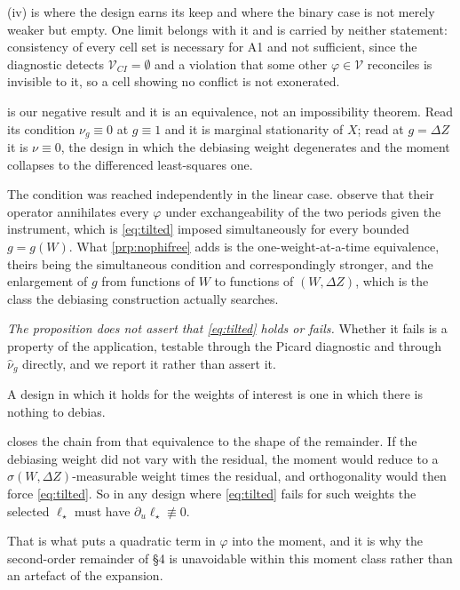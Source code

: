 \documentclass[
  12pt]{article}
\newcommand{\1}[1]{\mathds{1}\left[#1\right]}
\theoremstyle{plain}
\theoremstyle{definition}
\theoremstyle{definition}
\theoremstyle{remark}
\begin{document}
(iv) is where the design earns its keep and where the
binary case is not merely weaker but empty. One limit belongs with it
and is carried by neither statement: consistency of every cell set is
necessary for A1 and not sufficient, since the diagnostic detects
\(\mathcal V_{CI}=\emptyset\) and a violation that some other
\(\varphi\in\mathcal V\) reconciles is invisible to it, so a cell
showing no conflict is not exonerated.

 is our negative result and it is an equivalence,
not an impossibility theorem. Read its condition \(\nu_g\equiv0\) at
\(g\equiv1\) and it is marginal stationarity of \(X\); read at
\(g=\Delta Z\) it is \(\nu\equiv0\), the design in which the debiasing
weight degenerates and the moment collapses to the differenced
least-squares one.

The condition was reached independently in the linear case.
\citet{feve2014} observe that their operator annihilates every
\(\varphi\) under exchangeability of the two periods given the
instrument, which is \eqref{eq:tilted} imposed simultaneously for every
bounded \(g=g(W)\). What \cref{prp:nophifree} adds is the
one-weight-at-a-time equivalence, theirs being the simultaneous
condition and correspondingly stronger, and the enlargement of \(g\)
from functions of \(W\) to functions of \((W,\Delta Z)\), which is the
class the debiasing construction actually searches.

\emph{The proposition does not assert that \eqref{eq:tilted} holds or
fails.} Whether it fails is a property of the application, testable
through the Picard diagnostic and through \(\hat\nu_g\) directly, and we
report it rather than assert it.

A design in which it holds for the weights of interest is one in which
there is nothing to debias.

 closes the chain from that equivalence to the shape of
the remainder. If the debiasing weight did not vary with the residual,
the moment would reduce to a \(\sigma(W,\Delta Z)\)-measurable weight
times the residual, and orthogonality would then force
\eqref{eq:tilted}. So in any design where \eqref{eq:tilted} fails for
such weights the selected \(\ell_\star\) must have
\(\partial_u\ell_\star\not\equiv0\).

That is what puts a quadratic term in \(\varphi\) into the moment, and
it is why the second-order remainder of \S4 is unavoidable within this
moment class rather than an artefact of the expansion.
\end{document}
